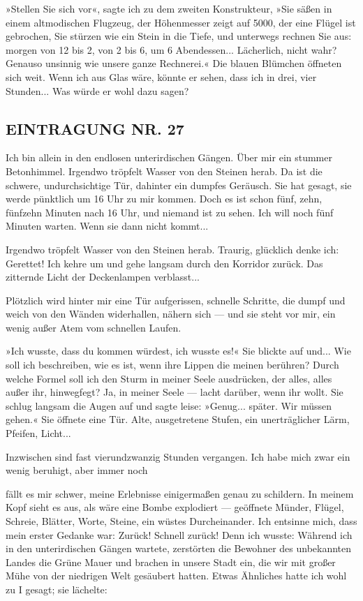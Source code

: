 »Stellen Sie sich vor«, sagte ich zu dem zweiten Konstrukteur, »Sie
säßen in einem altmodischen Flugzeug, der Höhenmesser zeigt auf
5000, der eine Flügel ist gebrochen, Sie stürzen wie ein Stein in
die Tiefe, und unterwegs rechnen Sie aus: morgen von 12 bis 2, von
2 bis 6, um 6 Abendessen... Lächerlich, nicht wahr? Genauso
unsinnig wie unsere ganze Rechnerei.« Die blauen Blümchen öffneten
sich weit. Wenn ich aus Glas wäre, könnte er sehen, dass ich in
drei, vier Stunden... Was würde er wohl dazu sagen?

\subsection{EINTRAGUNG NR. 27}

Ich bin allein in den endlosen unterirdischen Gängen. Über mir ein
stummer Betonhimmel. Irgendwo tröpfelt Wasser von den Steinen
herab. Da ist die schwere, undurchsichtige Tür, dahinter ein
dumpfes Geräusch. Sie hat gesagt, sie werde pünktlich um 16 Uhr zu
mir kommen. Doch es ist schon fünf, zehn, fünfzehn Minuten nach 16
Uhr, und niemand ist zu sehen. Ich will noch fünf Minuten warten.
Wenn sie dann nicht kommt...

Irgendwo tröpfelt Wasser von den Steinen herab. Traurig, glücklich
denke ich: Gerettet! Ich kehre um und gehe langsam durch den
Korridor zurück. Das zitternde Licht der Deckenlampen verblasst...

Plötzlich wird hinter mir eine Tür aufgerissen, schnelle Schritte,
die dumpf und weich von den Wänden widerhallen, nähern sich — und
sie steht vor mir, ein wenig außer Atem vom schnellen Laufen.

»Ich wusste, dass du kommen würdest, ich wusste es!« Sie blickte
auf und... Wie soll ich beschreiben, wie es ist, wenn ihre Lippen
die meinen berühren? Durch welche Formel soll ich den Sturm in
meiner Seele ausdrücken, der alles, alles außer ihr, hinwegfegt?
Ja, in meiner Seele — lacht darüber, wenn ihr wollt. Sie schlug
langsam die Augen auf und sagte leise: »Genug... später. Wir müssen
gehen.« Sie öffnete eine Tür. Alte, ausgetretene Stufen, ein
unerträglicher Lärm, Pfeifen, Licht...

Inzwischen sind fast vierundzwanzig Stunden vergangen. Ich habe
mich zwar ein wenig beruhigt, aber immer noch

fällt es mir schwer, meine Erlebnisse einigermaßen genau zu
schildern. In meinem Kopf sieht es aus, als wäre eine Bombe
explodiert — geöffnete Münder, Flügel, Schreie, Blätter, Worte,
Steine, ein wüstes Durcheinander. Ich entsinne mich, dass mein
erster Gedanke war: Zurück! Schnell zurück! Denn ich wusste:
Während ich in den unterirdischen Gängen wartete, zerstörten die
Bewohner des unbekannten Landes die Grüne Mauer und brachen in
unsere Stadt ein, die wir mit großer Mühe von der niedrigen Welt
gesäubert hatten. Etwas Ähnliches hatte ich wohl zu I gesagt; sie
lächelte:

